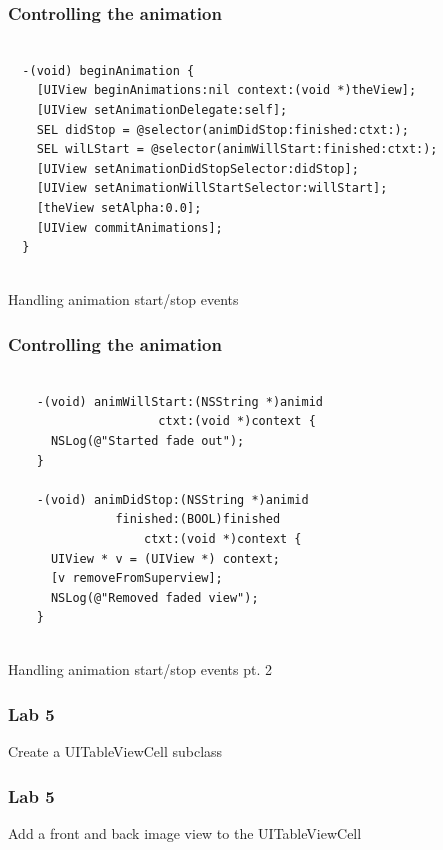 \documentclass[10pt]{beamer}
\begin{document}
\begin{frame}[fragile]
  \frametitle{Controlling the animation}
  \begin{listing}[H]
    \begin{verbatim}
  
  -(void) beginAnimation {
    [UIView beginAnimations:nil context:(void *)theView];
    [UIView setAnimationDelegate:self];
    SEL didStop = @selector(animDidStop:finished:ctxt:);
    SEL wilLStart = @selector(animWillStart:finished:ctxt:);
    [UIView setAnimationDidStopSelector:didStop];
    [UIView setAnimationWillStartSelector:willStart];
    [theView setAlpha:0.0];
    [UIView commitAnimations];
  }
              
  \end{verbatim}
    \caption{Handling animation start/stop events}
    \label{listing:37}
  \end{listing}

\end{frame}

\begin{frame}[fragile]
  \frametitle{Controlling the animation}
  \begin{listing}[H]
      \begin{verbatim}
    
    -(void) animWillStart:(NSString *)animid
                     ctxt:(void *)context {
      NSLog(@"Started fade out");
    }
    
    -(void) animDidStop:(NSString *)animid
               finished:(BOOL)finished
                   ctxt:(void *)context {
      UIView * v = (UIView *) context;
      [v removeFromSuperview];
      NSLog(@"Removed faded view");
    }
                
    \end{verbatim}
      \caption{Handling animation start/stop events pt. 2}
      \label{listing:38}
    \end{listing}

\end{frame}

    
\begin{frame}[fragile]
  \frametitle{Lab 5}
  Create a UITableViewCell subclass

\end{frame}

\begin{frame}[fragile]
  \frametitle{Lab 5}
  Add a front and back image view to the UITableViewCell

\end{frame}
\end{document}
